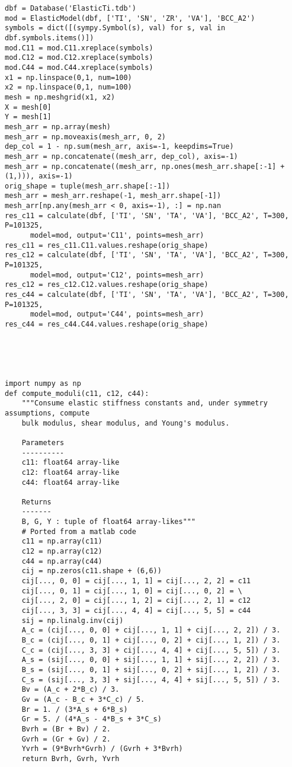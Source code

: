 {\begin{lstlisting}
dbf = Database('ElasticTi.tdb')
mod = ElasticModel(dbf, ['TI', 'SN', 'ZR', 'VA'], 'BCC_A2')
symbols = dict([(sympy.Symbol(s), val) for s, val in dbf.symbols.items()])
mod.C11 = mod.C11.xreplace(symbols)
mod.C12 = mod.C12.xreplace(symbols)
mod.C44 = mod.C44.xreplace(symbols)
x1 = np.linspace(0,1, num=100)
x2 = np.linspace(0,1, num=100)
mesh = np.meshgrid(x1, x2)
X = mesh[0]
Y = mesh[1]
mesh_arr = np.array(mesh)
mesh_arr = np.moveaxis(mesh_arr, 0, 2)
dep_col = 1 - np.sum(mesh_arr, axis=-1, keepdims=True)
mesh_arr = np.concatenate((mesh_arr, dep_col), axis=-1)
mesh_arr = np.concatenate((mesh_arr, np.ones(mesh_arr.shape[:-1] + (1,))), axis=-1)
orig_shape = tuple(mesh_arr.shape[:-1])
mesh_arr = mesh_arr.reshape(-1, mesh_arr.shape[-1])
mesh_arr[np.any(mesh_arr < 0, axis=-1), :] = np.nan
res_c11 = calculate(dbf, ['TI', 'SN', 'TA', 'VA'], 'BCC_A2', T=300, P=101325,
      model=mod, output='C11', points=mesh_arr)
res_c11 = res_c11.C11.values.reshape(orig_shape)
res_c12 = calculate(dbf, ['TI', 'SN', 'TA', 'VA'], 'BCC_A2', T=300, P=101325,
      model=mod, output='C12', points=mesh_arr)
res_c12 = res_c12.C12.values.reshape(orig_shape)
res_c44 = calculate(dbf, ['TI', 'SN', 'TA', 'VA'], 'BCC_A2', T=300, P=101325,
      model=mod, output='C44', points=mesh_arr)
res_c44 = res_c44.C44.values.reshape(orig_shape)





import numpy as np
def compute_moduli(c11, c12, c44):
    """Consume elastic stiffness constants and, under symmetry assumptions, compute
    bulk modulus, shear modulus, and Young's modulus.

    Parameters
    ----------
    c11: float64 array-like
    c12: float64 array-like
    c44: float64 array-like

    Returns
    -------
    B, G, Y : tuple of float64 array-likes"""
    # Ported from a matlab code
    c11 = np.array(c11)
    c12 = np.array(c12)
    c44 = np.array(c44)
    cij = np.zeros(c11.shape + (6,6))
    cij[..., 0, 0] = cij[..., 1, 1] = cij[..., 2, 2] = c11
    cij[..., 0, 1] = cij[..., 1, 0] = cij[..., 0, 2] = \
    cij[..., 2, 0] = cij[..., 1, 2] = cij[..., 2, 1] = c12
    cij[..., 3, 3] = cij[..., 4, 4] = cij[..., 5, 5] = c44
    sij = np.linalg.inv(cij)
    A_c = (cij[..., 0, 0] + cij[..., 1, 1] + cij[..., 2, 2]) / 3.
    B_c = (cij[..., 0, 1] + cij[..., 0, 2] + cij[..., 1, 2]) / 3.
    C_c = (cij[..., 3, 3] + cij[..., 4, 4] + cij[..., 5, 5]) / 3.
    A_s = (sij[..., 0, 0] + sij[..., 1, 1] + sij[..., 2, 2]) / 3.
    B_s = (sij[..., 0, 1] + sij[..., 0, 2] + sij[..., 1, 2]) / 3.
    C_s = (sij[..., 3, 3] + sij[..., 4, 4] + sij[..., 5, 5]) / 3.
    Bv = (A_c + 2*B_c) / 3.
    Gv = (A_c - B_c + 3*C_c) / 5.
    Br = 1. / (3*A_s + 6*B_s)
    Gr = 5. / (4*A_s - 4*B_s + 3*C_s)
    Bvrh = (Br + Bv) / 2.
    Gvrh = (Gr + Gv) / 2.
    Yvrh = (9*Bvrh*Gvrh) / (Gvrh + 3*Bvrh)
    return Bvrh, Gvrh, Yvrh


\end{lstlisting}}
